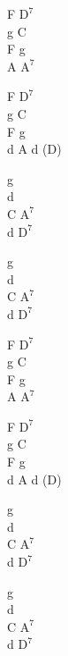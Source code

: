 \begin{chord}
    F $\mathrm{D^{7}}$\\
    g C\\
    F g\\
    A $\mathrm{A^{7}}$

    F $\mathrm{D^{7}}$\\
    g C\\
    F g\\
    d A d (D)

    g\\
    d\\
    C $\mathrm{A^{7}}$\\
    d $\mathrm{D^{7}}$

    g\\
    d\\
    C $\mathrm{A^{7}}$\\
    d $\mathrm{D^{7}}$

    F $\mathrm{D^{7}}$\\
    g C\\
    F g\\
    A $\mathrm{A^{7}}$

    F $\mathrm{D^{7}}$\\
    g C\\
    F g\\
    d A d (D)

    g\\
    d\\
    C $\mathrm{A^{7}}$\\
    d $\mathrm{D^{7}}$

    g\\
    d\\
    C $\mathrm{A^{7}}$\\
    d $\mathrm{D^{7}}$
\end{chord}
